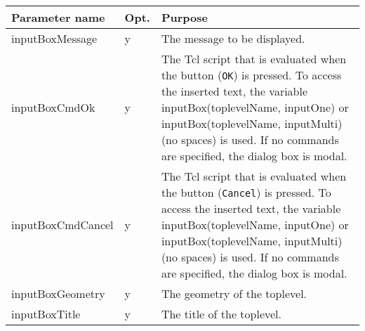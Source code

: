 {\newpage
\clearpage
\samepage \begin{figure}[ht]
  \centerline{
  \epsfysize=10.5cm
  }
  
  \label{fig:IconBarConf}
\end{figure}
}

{\newpage
\clearpage
\samepage \begin{tabular}{|l|l|p{6.3cm}|} \hline
Parameter name    & Opt. & Purpose\\  \hline
inputBoxMessage   & y    & The message to be displayed.\\  \hline
inputBoxCmdOk     & y    & The Tcl script that is
                           evaluated when the button
                           ({\tt OK\tt}) is pressed.
                           To access the inserted text,
                           the variable
                           input\-Box(top\-level\-Name,
                           input\-One) or
                           input\-Box(top\-level\-Name,
                           input\-Multi) (no spaces)
                           is used. If no commands are
                           specified, the dialog box is
                           modal.\\  \hline 
inputBoxCmdCancel & y    & The Tcl script that is
                           evaluated when the button
                           ({\tt Cancel\tt}) is
                           pressed. To access the
                           inserted text, the variable
                           input\-Box(top\-level\-Name,
                           input\-One) or
                           input\-Box(top\-level\-Name,
                           input\-Multi) (no spaces) is
                           used. If no commands are
                           specified, the dialog box is
                           modal.\\  \hline
inputBoxGeometry  & y    & The geometry of the toplevel.\\  \hline 
inputBoxTitle     & y    & The title of the toplevel.\\  \hline
\end{tabular}
}

